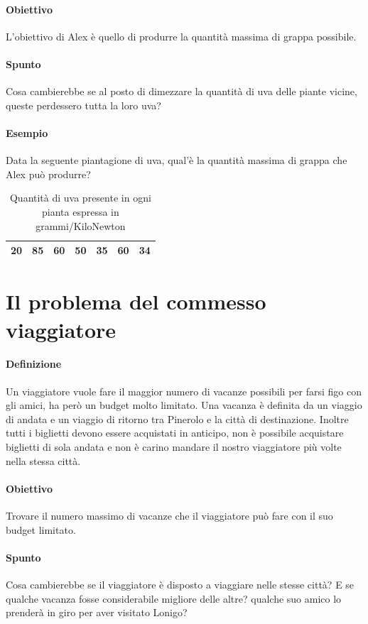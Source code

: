     \paragraph{Obiettivo} L'obiettivo di Alex è quello di produrre la quantità massima di grappa possibile.
    \paragraph{Spunto} Cosa cambierebbe se al posto di dimezzare la quantità di uva delle piante vicine, queste perdessero tutta la loro uva?
    \paragraph{Esempio} Data la seguente piantagione di uva, qual'è la quantità massima di grappa che Alex può produrre?

    \begin{table}[h!]
        \centering
        \caption{Quantità di uva presente in ogni pianta espressa in grammi/KiloNewton}
        \label{tab:costi_voli}
        \begin{tabular}{|c|c|c|c|c|c|c|}
        \hline
            20 & 85 & 60 & 50 & 35 & 60 & 34\\ \hline
        \end{tabular}
    \end{table}

\newpage
\thispagestyle{chapterInit}
\section*{Il problema del commesso viaggiatore}
    \paragraph{Definizione} Un viaggiatore vuole fare il maggior numero di vacanze possibili per farsi figo con gli amici, ha però un budget molto limitato. Una vacanza è definita da un viaggio di andata e un viaggio di ritorno tra Pinerolo e la città di destinazione. Inoltre tutti i biglietti devono essere acquistati in anticipo, non è possibile acquistare biglietti di sola andata e non è carino mandare il nostro viaggiatore più volte nella stessa città.
    \paragraph{Obiettivo} Trovare il numero massimo di vacanze che il viaggiatore può fare con il suo budget limitato.
    \paragraph{Spunto} Cosa cambierebbe se il viaggiatore è disposto a viaggiare nelle stesse città? E se qualche vacanza fosse considerabile migliore delle altre? qualche suo amico lo prenderà in giro per aver visitato Lonigo?
